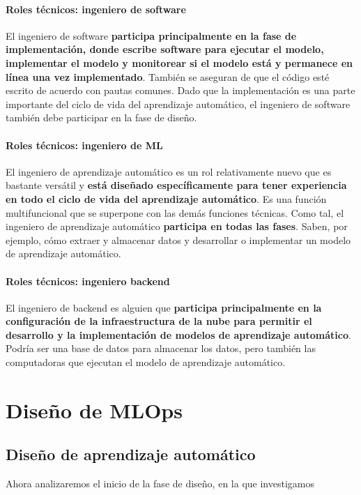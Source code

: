 \documentclass[10pt]{book}
\begin{document}
\paragraph{Roles técnicos: ingeniero de software}
El ingeniero de software \textbf{participa principalmente en la fase de implementación, donde escribe software para ejecutar el modelo, implementar el modelo y monitorear si el modelo está y permanece en línea una vez implementado}. También se aseguran de que el código esté escrito de acuerdo con pautas comunes. Dado que la implementación es una parte importante del ciclo de vida del aprendizaje automático, el ingeniero de software también debe participar en la fase de diseño.

\paragraph{Roles técnicos: ingeniero de ML}
El ingeniero de aprendizaje automático es un rol relativamente nuevo que es bastante versátil y \textbf{está diseñado específicamente para tener experiencia en todo el ciclo de vida del aprendizaje automático}. Es una función multifuncional que se superpone con las demás funciones técnicas. Como tal, el ingeniero de aprendizaje automático \textbf{participa en todas las fases}. Saben, por ejemplo, cómo extraer y almacenar datos y desarrollar o implementar un modelo de aprendizaje automático.

\paragraph{Roles técnicos: ingeniero backend}
El ingeniero de backend es alguien que \textbf{participa principalmente en la configuración de la infraestructura de la nube para permitir el desarrollo y la implementación de modelos de aprendizaje automático}. Podría ser una base de datos para almacenar los datos, pero también las computadoras que ejecutan el modelo de aprendizaje automático.


\section{Diseño de MLOps}

\subsection{Diseño de aprendizaje automático}
Ahora analizaremos el inicio de la fase de diseño, en la que investigamos
\end{document}
